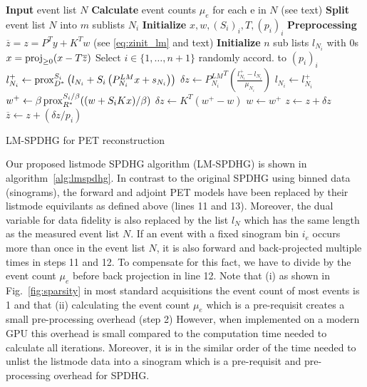 \begin{algorithm}[t]
\begin{algorithmic}[1]
\small
\State \textbf{Input} event list $N$
\State \textbf{Calculate} event counts $\mu_e$ for each e in $N$ (see text)
\State \textbf{Split} event list $N$ into $m$ sublists $N_i$
\State \textbf{Initialize} $x,w,(S_i)_i,T,(p_i)_i$
\State \textbf{Preprocessing} $\overline{z} = z = P^T y + K^T w$ (see \eqref{eq:zinit_lm} and text)
\State \textbf{Initialize} $n$ sub lists $l_{N_i}$ with 0s
\Repeat
	\State $x = \operatorname{proj}_{\geq 0} (x - T \overline{z})$
	\State Select $i \in \{1,\ldots,n+1\}$ randomly accord. to $(p_i)_i$
	  \State $l_{N_i}^+ \gets \operatorname{prox}_{D^*}^{S_i} \left( l_{N_i} + S_i \left(P^{LM}_{N_i} x + s_{N_i} \right) \right)$
	  \State $\delta z \gets {P^{LM}_{N_i}}^T \left(\frac{l_{N_i}^+ - l_{N_i}}{\mu_{N_i}}\right)$
	  \State $l_{N_i} \gets l_{N_i}^+$
  \Else
	  \State $w^+ \gets \beta \operatorname{prox}_{R^*}^{S_i/\beta} ((w + S_i  K x)/\beta)$
	  \State $\delta z \gets K^T \left(w^+ - w\right)$
	  \State $w \gets w^+$
  \EndIf
	\State $z \gets z + \delta z$
	\State $\overline{z} \gets  z + (\delta z/p_i)$
\State {}
\end{algorithmic}
\caption{LM-SPDHG for PET reconstruction}
\label{alg:lmspdhg}
\end{algorithm}


Our proposed listmode SPDHG algorithm (LM-SPDHG) is shown in algorithm~\ref{alg:lmspdhg}.
In contrast to the original SPDHG using binned data (sinograms), the forward and adjoint
PET models have been replaced by their listmode equivilants as defined above (lines 11 and 13).
Moreover, the dual variable for data fidelity is also replaced by the list $l_N$ which has the
same length as the measured event list $N$.
If an event with a fixed sinogram bin $i_e$ occurs more than once in the event list
$N$, it is also forward and back-projected multiple times in steps 11 and 12.
To compensate for this fact, we have to divide by the event count $\mu_e$ before back projection
in line 12.
Note that (i) as shown in Fig.~\ref{fig:sparsity} in most standard acquisitions the event count
of most events is 1 and that (ii) calculating the event count $\mu_e$ which is a pre-requisit
creates a small pre-processing overhead (step 2)
However, when implemented on a modern GPU this overhead is small compared to the computation
time needed to calculate all iterations.
Moreover, it is in the similar order of the time needed to unlist the listmode data into
a sinogram which is a pre-requisit and pre-processing overhead for SPDHG.

